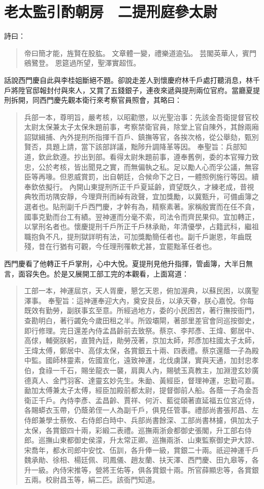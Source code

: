 
\chapter{老太監引酌朝房　二提刑庭參太尉}

詩曰：
\begin{quote}
帝曰簡才能，旌賢在股肱。
文章體一變，禮樂道逾弘。
芸閣英華人，賓門鵷鷺登。
恩筵過所望，聖澤實超恆。
\end{quote}

話說西門慶自此與李桂姐斷絕不題。卻說走差人到懷慶府林千戶處打聽消息，林千戶將陞官邸報封付與來人，又賞了五錢銀子，連夜來遞與提刑兩位官府。當廳夏提刑拆開，同西門慶先觀本衛行來考察官員照會，其略曰：
\begin{quote}
兵部一本，尊明旨，嚴考核，以昭勸懲，以光聖治事：先該金吾衛提督官校太尉太保兼太子太保朱題前事，考察禁衛官員，除堂上官自陳外，其餘兩廂詔獄緝捕、內外提刑所指揮千百戶、鎮撫等官，各挨次格，從公舉劾，甄別賢否，具題上請，當下該部詳議，黜陟升調降革等因。
奉聖旨：兵部知道，欽此欽遵。抄出到部。看得太尉朱題前事，遵奉舊例，委的本官殫力致忠，公於考核，皆出聞見之實，而無偏執之私。足以勵人心而孚公議，無容臣等再喙。但恩威賞罰，出自朝廷，合候命下之日，一體照例施行等因。續奉欽依擬行。
內開山東提刑所正千戶夏延齡，資望既久，才練老成，昔視典牧而坊隅安靜，今理齊刑而綽有政聲，宜加獎勵，以冀甄升，可備鹵簿之選者也。貼刑副千戶西門慶，才幹有為，精察素著。家稱殷實而在任不貪，國事克勤而台工有績。翌神運而分毫不索，司法令而齊民果仰。宜加轉正，以掌刑名者也。懷慶提刑千戶所正千戶林承勛，年清優學，占籍武科，繼祖職抱負不凡，提刑獄詳明有法，可加獎勵簡任者也。副千戶謝恩，年齒既殘，昔在行猶有可觀，今任理刑罹軟尤甚，宜罷黜革任者也。
\end{quote}

西門慶看了他轉正千戶掌刑，心中大悅。夏提刑見他升指揮，管鹵簿，大半日無言，面容失色。於是又展開工部工完的本觀看，上面寫道：
\begin{quote}
工部一本，神運屆京，天人胥慶，懇乞天恩，俯加渥典，以蘇民困，以廣聖澤事。
奉聖旨：這神運奉迎大內，奠安艮岳，以承天眷，朕心嘉悅。你每既效有勤勞，副朕事玄至意。所經過地方，委的小民困苦，著行撫按衙門，查勘明白，著行蠲免今歲田租之半。所毀壩閘，著部里差官會同巡按御史，即行修理。完日還差內侍孟昌齡前去致祭。蔡京、李邦彥、王煒、鄭居中、高俅，輔弼朕躬，直贊內廷，勛勞茂著，京加太師，邦彥加柱國太子太師，王煒太傅，鄭居中、高俅太保，各賞銀五十兩、四表禮。蔡京還蔭一子為殿中監。國師林靈素，佐國宣化，遠致神運，北伐虜謀，實與天通，加封忠孝伯，食祿一千石，賜坐龍衣一襲，肩輿人內，賜號玉真教主，加淵澄玄妙廣德真人、金門羽客、達靈玄妙先生。朱勔、黃經臣，督理神運，忠勤可嘉。勔加太傅兼太子太傅，經臣加殿前都太尉，提督御前人船。各蔭一子為金吾衛正千戶。內侍李彥、孟昌齡、賈祥、何沂、藍從頤著直延福五位宮近侍，各賜蟒衣玉帶，仍蔭弟侄一人為副千戶，俱見任管事。禮部尚書張邦昌、左侍郎兼學士蔡攸、右侍郎白時中、兵部尚書餘深、工部尚書林攄，俱加太子太保，各賞銀四十兩，彩緞二表禮。巡撫兩浙僉都御史張閣，升工部右侍郎。巡撫山東都御史侯濛，升太常正卿。巡撫兩浙、山東監察御史尹大諒、宋喬年，都水司郎中安忱、伍訓，各升俸一級，賞銀二十兩。祇迎神運千戶魏承勛、徐相、楊廷佩、司鳳儀、趙友蘭、扶天澤、西門慶、田九皋等，各升一級。內侍宋推等，營將王佑等，俱各賞銀十兩。所官薛顯忠等，各賞銀五兩。校尉昌玉等，絹二匹。該衙門知道。
\end{quote}

